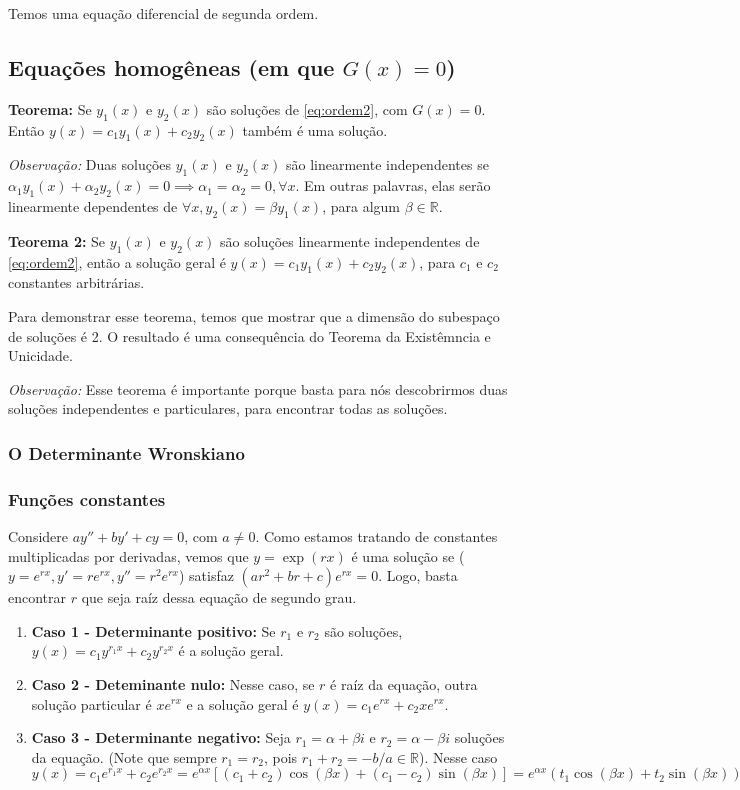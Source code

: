 \documentclass[12pt]{article}
\begin{document}
Temos uma equação diferencial de segunda ordem.

\subsection{Equações homogêneas (em que $G(x) = 0$)}

\textbf{Teorema:} Se $y_1(x)$ e $y_2(x)$ são soluções de \ref{eq:ordem2}, com
$G(x) = 0$. Então $y(x) = c_1y_1(x) + c_2y_2(x)$ também é uma solução. 

\textit{Observação:} Duas soluções $y_1(x)$ e $y_2(x)$ são linearmente
independentes se $\alpha_1y_1(x) + \alpha_2y_2(x) = 0 \implies \alpha_1 =
\alpha_2 = 0, \forall x$. Em outras palavras, elas serão linearmente
dependentes de $\forall x, y_2(x) = \beta y_1(x)$, para algum $\beta \in
\mathbb{R}$.  

\textbf{Teorema 2:} Se $y_1(x)$ e $y_2(x)$ são soluções linearmente
independentes de \ref{eq:ordem2}, então a solução geral é $y(x) = c_1y_1(x) +
c_2y_2(x)$, para $c_1$ e $c_2$ constantes arbitrárias. 

Para demonstrar esse teorema, temos que mostrar que a dimensão do subespaço de
soluções é 2. O resultado é uma consequência do Teorema da Existêmncia e
Unicidade. 

\textit{Observação:} Esse teorema é importante porque basta para nós
descobrirmos duas soluções independentes e particulares, para encontrar todas
as soluções. 

\subsubsection{O Determinante Wronskiano}

\subsubsection{Funções constantes}

Considere $ay'' + by' + cy = 0$, com $a \neq 0$. Como estamos tratando de
constantes multiplicadas por derivadas, vemos que $y = \exp(rx)$ é uma
solução se ($y = e^{rx}, y' = re^{rx}, y'' = r^2e^{rx}$) satisfaz $(ar^2 + br
+ c)e^{rx} = 0$. Logo, basta encontrar $r$ que seja raíz dessa equação de
segundo grau. 

\begin{enumerate}
    \item \textbf{Caso 1 - Determinante positivo:} Se $r_1$ e $r_2$ são
    soluções, $y(x) = c_1y^{r_1x} + c_2y^{r_2x}$ é a solução geral.
    \item \textbf{Caso 2 - Deteminante nulo:} Nesse caso, se $r$ é raíz da
    equação, outra solução particular é $xe^{rx}$ e a solução geral é $y(x) =
    c_1e^{rx} + c_2xe^{rx}$.  
    \item \textbf{Caso 3 - Determinante negativo:} Seja $r_1 = \alpha + \beta
    i$ e $r_2 = \alpha - \beta i$ soluções da equação. (Note que sempre $r_1
    = r_2$, pois $r_1 + r_2 = -b/a \in \mathbb{R}$).  Nesse caso $y(x) =
    c_1e^{r_1x} + c_2e^{r_2x} = e^{\alpha x}[(c_1 + c_2)\cos(\beta x) + (c_1 -
    c_2)\sin(\beta x)] = e^{\alpha x}(t_1\cos(\beta x) + t_2\sin(\beta x))$
\end{enumerate}
\end{document}
